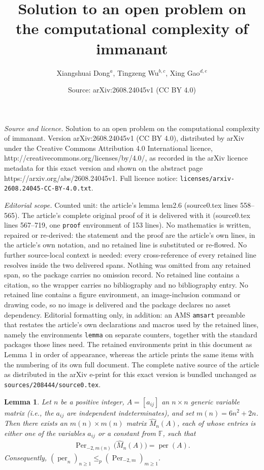 \documentclass[10pt,a4paper]{amsart}
\title{Solution to an open problem on the computational complexity of immanant}
\author{Xiangshuai Dong$^a$, Tingzeng Wu$^{b,c}$, Xing Gao$^{d,e}$}
\date{Source: arXiv:2608.24045v1 (CC BY 4.0)}
\newtheorem{lemma}{Lemma}
\begin{document}
\maketitle

\noindent\emph{Source and licence.} Solution to an open problem on the computational complexity of immanant. Version arXiv:2608.24045v1 (CC BY 4.0), distributed by arXiv under the Creative Commons Attribution 4.0 International licence, http://creativecommons.org/licenses/by/4.0/, as recorded in the arXiv licence metadata for this exact version and shown on the abstract page https://arxiv.org/abs/2608.24045v1. Full licence notice: \texttt{licenses/arxiv-2608.24045-CC-BY-4.0.txt}.\par\smallskip

\noindent\textit{Editorial scope.} Counted unit: the article's lemma lem2.6 (source0.tex lines 558--565). The article's complete original proof of it is delivered with it (source0.tex lines 567--719, one \texttt{proof} environment of 153 lines). No mathematics is written, repaired or re-derived: the statement and the proof are the article's own lines, in the article's own notation, and no retained line is substituted or re-flowed.  No further source-local context is needed: every cross-reference of every retained line resolves inside the two delivered spans.  Nothing was omitted from any retained span, so the package carries no omission record.  No retained line contains a citation, so the wrapper carries no bibliography and no bibliography entry.  No retained line contains a figure environment, an image-inclusion command or drawing code, so no image is delivered and the package declares no asset dependency.  Editorial formatting only, in addition: an AMS \texttt{amsart} preamble that restates the article's own declarations and macros used by the retained lines, namely the environments \texttt{lemma} on separate counters, together with the standard packages those lines need.  The retained environments print in this document as Lemma 1 in order of appearance, whereas the article prints the same items with the numbering of its own full document.  The complete native source of the article as distributed in the arXiv e-print for this exact version is bundled unchanged as \texttt{sources/208444/source0.tex}.
\begin{lemma}\label{lem2.6}
Let $n$ be a positive integer, $A=[a_{ij}]$ an $n\times n$ generic variable matrix (i.e., the $a_{ij}$ are independent indeterminates), and set $m(n)=6n^2+2n$. Then there exists an $m(n)\times m(n)$ matrix $\widehat M_n(A)$, each of whose entries is either one of the variables $a_{ij}$ or a constant from $\mathbb{F}$, such that
\begin{eqnarray*}
  \operatorname{Per}_{-2,m(n)}\bigl(\widehat M_n(A)\bigr)=\operatorname{per}(A).
\end{eqnarray*}
Consequently,
$(\operatorname{per}_n)_{n\geq 1}\leq_p(\operatorname{Per}_{-2,m})_{m\geq 1}$.
\end{lemma}
\end{document}
